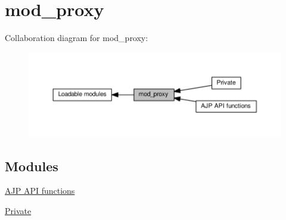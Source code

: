 \hypertarget{group__MOD__PROXY}{}\section{mod\+\_\+proxy}
\label{group__MOD__PROXY}
Collaboration diagram for mod\+\_\+proxy\+:
\nopagebreak
\begin{figure}[H]
\begin{center}
\leavevmode
\includegraphics[width=350pt]{group__MOD__PROXY}
\end{center}
\end{figure}
\subsection*{Modules}
\begin{DoxyCompactItemize}
\item 
\hyperlink{group__AJP__api}{A\+J\+P A\+P\+I functions}
\item 
\hyperlink{group__MOD__PROXY__PRIVATE}{Private}
\end{DoxyCompactItemize}
